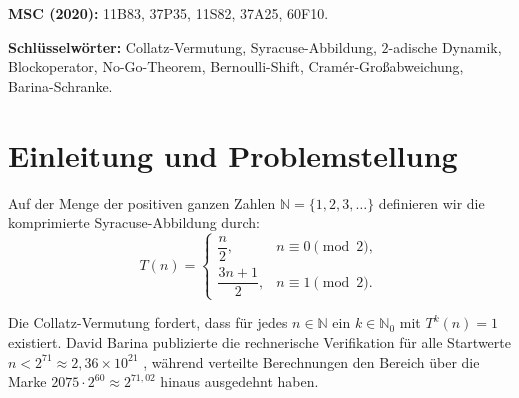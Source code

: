 \documentclass[11pt,reqno]{amsart}
\theoremstyle{definition}
\theoremstyle{remark}
\numberwithin{equation}{section}
\begin{document}
\begin{abstract}
\begin{enumerate}
\item \textbf{Topologische Dichotomie auf $\mathbb{N}$:} F\"ur deterministische Orbits auf $\mathbb{N}$ existiert keine unbeschr\"ankte Oszillation mit unendlich vielen R\"uckkehren in kompakte Bereiche: Jeder unbeschr\"ankte Orbit divergiert bestimmt gegen unendlich ($n_i \to \infty$), wodurch die affinen Restterme im Ces\`aro-Mittel verschwinden ($\bar{\eta}_K \to 0$).
\end{enumerate}
Die Analyse isoliert damit zwei weiterhin offene arithmetische Collatz-Gatter. Erstens m\"ussen s\"amtliche nichttrivialen realisierbaren Blockzyklen ausgeschlossen werden. Zweitens muss ausgeschlossen werden, dass ein unbeschr\"ankter positiver ganzzahliger Orbit dauerhaft eine Blockfolge mit nichtnegativer asymptotischer Hauptdrift realisiert. Die $2$-adische Fast-\"uberall-Statistik ersetzt keine dieser beiden universellen arithmetischen Aussagen.
\end{abstract}

\medskip

\noindent\textbf{MSC (2020):}
11B83, 37P35, 11S82, 37A25, 60F10.

\noindent\textbf{Schl\"usselw\"orter:}
Collatz-Vermutung, Syracuse-Abbildung, $2$-adische Dynamik,
Blockoperator, No-Go-Theorem, Bernoulli-Shift, Cram\'er-Gro\ss{}abweichung, Barina-Schranke.

\section{Einleitung und Problemstellung}

Auf der Menge der positiven ganzen Zahlen $\mathbb{N} = \{1, 2, 3, \ldots\}$ definieren wir die komprimierte Syracuse-Abbildung durch:
\begin{equation}
T(n) =
\begin{cases}
\dfrac{n}{2}, & n \equiv 0 \pmod 2, \\[0.8em]
\dfrac{3n+1}{2}, & n \equiv 1 \pmod 2.
\end{cases}
\label{eq:syracuse}
\end{equation}

Die Collatz-Vermutung fordert, dass f\"ur jedes $n \in \mathbb{N}$ ein $k \in \mathbb{N}_0$ mit $T^k(n) = 1$ existiert. David Barina publizierte die rechnerische Verifikation f\"ur alle Startwerte $n < 2^{71} \approx 2{,}36 \times 10^{21}$ \cite{Barina2025}, w\"ahrend verteilte Berechnungen den Bereich \"uber die Marke $2075 \cdot 2^{60} \approx 2^{71{,}02}$ hinaus ausgedehnt haben.
\end{document}
